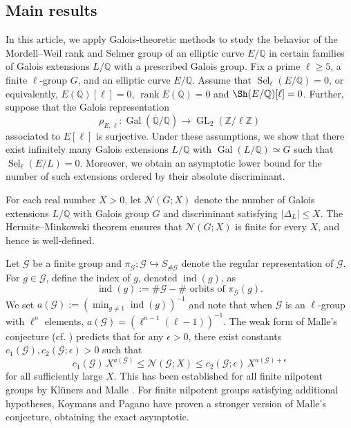 \documentclass[11pt,reqno]{amsart}
\newcommand{\cG}{\mathcal{G}}
\newcommand{\Z}{\mathbb{Z}}
\newcommand{\Q}{\mathbb{Q}}
\newcommand{\op}[1]{\operatorname{#1}}
\numberwithin{equation}{section}
\begin{document}
\subsection{Main results}
In this article, we apply Galois-theoretic methods to study the behavior of the Mordell{--}Weil rank and Selmer group of an elliptic curve \( E/\Q \) in certain families of Galois extensions \( L/\Q \) with a prescribed Galois group. Fix a prime \( \ell \geq 5 \), a finite \( \ell \)-group \( G \), and an elliptic curve \( E/\Q \). Assume that \( \operatorname{Sel}_\ell(E/\Q) = 0 \), or equivalently, $E(\Q)[\ell]=0$, $\op{rank}E(\Q)=0$ and $\Sh(E/\Q)[\ell]=0$. Further, suppose that the Galois representation
\[
\rho_{E,\ell} : \operatorname{Gal}(\overline{\Q}/\Q) \longrightarrow \operatorname{GL}_2(\Z/\ell\Z)
\]
associated to \( E[\ell] \) is surjective. Under these assumptions, we show that there exist infinitely many Galois extensions \( L/\Q \) with \( \operatorname{Gal}(L/\Q) \simeq G \) such that \( \operatorname{Sel}_\ell(E/L) = 0 \). Moreover, we obtain an asymptotic lower bound for the number of such extensions ordered by their absolute discriminant.

For each real number \( X > 0 \), let \( \mathcal{N}(G; X) \) denote the number of Galois extensions \( L/\Q \) with Galois group \( G \) and discriminant satisfying \( |\Delta_L| \leq X \). The Hermite{--}Minkowski theorem ensures that \( \mathcal{N}(G; X) \) is finite for every \( X \), and hence is well-defined.

Let $\cG$ be a finite group and \( \pi_\cG : \cG \hookrightarrow S_{\#\cG} \) denote the regular representation of \( \cG \). For \( g \in \cG \), define the index of \( g \), denoted \( \operatorname{ind}(g) \), as
\[
\operatorname{ind}(g) := \#\cG - \#\text{ orbits of } \pi_\cG(g).
\]
We set $a(\cG) := \left( \min_{g \neq 1} \operatorname{ind}(g) \right)^{-1}$ and note that when $\cG$ is an $\ell$-group with $\ell^n$ elements, $a(\cG)= \left( \ell^{n-1}(\ell - 1) \right)^{-1}$. The weak form of Malle's conjecture (cf. \cite[p.316]{Malle1}) predicts that for any \( \epsilon > 0 \), there exist constants \( c_1(\cG), c_2(\cG; \epsilon) > 0 \) such that
\[
c_1(\cG)\, X^{a(\cG)} \leq \mathcal{N}(\cG; X) \leq c_2(\cG; \epsilon)\, X^{a(\cG) + \epsilon}
\]
for all sufficiently large \( X \). This has been established for all finite nilpotent groups by Kl\"uners and Malle \cite{klunersmalle}. For finite nilpotent groups satisfying additional hypotheses, Koymans and Pagano \cite{koymans2023malle} have proven a stronger version of Malle's conjecture, obtaining the exact asymptotic.
\end{document}
